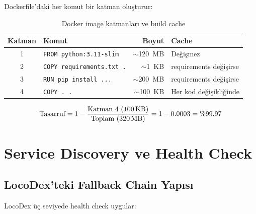 Dockerfile'daki her komut bir katman olu\c{s}turur:

\begin{table}[H]
\centering
\caption{Docker image katmanlar{\i} ve build cache}
\label{tab:layers}
\begin{tabularx}{\textwidth}{clrX}
\toprule
\color{chapterBlue}\textbf{Katman} & \color{chapterBlue}\textbf{Komut} & \color{chapterBlue}\textbf{Boyut} & \color{chapterBlue}\textbf{Cache} \\
\midrule
1 & \texttt{FROM python:3.11-slim}     & $\sim$120~MB  & De\u{g}i\c{s}mez \\
2 & \texttt{COPY requirements.txt .}   & $\sim$1~KB    & requirements de\u{g}i\c{s}irse \\
3 & \texttt{RUN pip install ...}       & $\sim$200~MB  & requirements de\u{g}i\c{s}irse \\
4 & \texttt{COPY . .}                  & $\sim$100~KB  & Her kod de\u{g}i\c{s}ikli\u{g}inde \\
\bottomrule
\end{tabularx}
\end{table}

\begin{equation}
\label{eq:cache-saving}
\text{Tasarruf} = 1 - \frac{\text{Katman 4 (100\,KB)}}{\text{Toplam (320\,MB)}} = 1 - 0.0003 = \%99.97
\end{equation}


\section{Service Discovery ve Health Check}
\label{sec:service-discovery}

\subsection{LocoDex'teki Fallback Chain Yap{\i}s{\i}}
\label{sec:fallback-chain}

LocoDex \"{u}\c{c} seviyede health check uygular:

